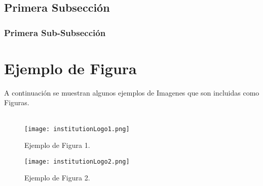 \documentclass[12pt]{article}
\begin{document}
\subsection{Primera Subsección}
\lipsum[1-5]

\newpage
\subsubsection{Primera Sub-Subsección}
\lipsum[1-4]

\newpage
\section{Ejemplo de Figura}
A continuación se muestran algunos ejemplos de Imagenes que son incluidas como Figuras.\\
\\ \lipsum[1-3]
\begin{figure}[!htb]
  \centering
  \texttt{[image: institutionLogo1.png]}
  \caption{Ejemplo de Figura 1.}
\end{figure}

\newpage
\lipsum[1-3]
\begin{figure}[!htb]
  \centering
  \texttt{[image: institutionLogo2.png]}
  \caption{Ejemplo de Figura 2.}
\end{figure}

\newpage
\end{document}
